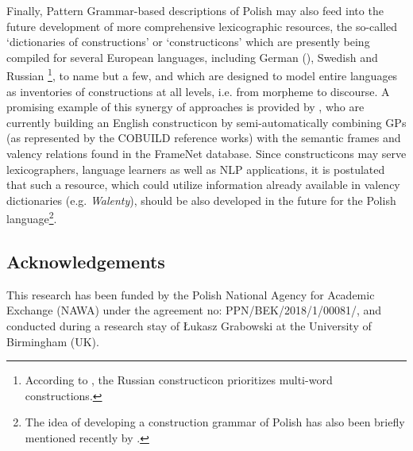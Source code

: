\documentclass[output=paper]{langscibook}
\begin{document}
Finally, Pattern Grammar-based descriptions of Polish may also feed into the future development of more comprehensive lexicographic resources, the so-called ‘dictionaries of constructions’ or ‘constructicons’ which are presently being compiled for several European languages, including German (\citealt{BoasZiem2018}), Swedish \citep{LyngfeltEtAl2018AtWork} and Russian \citep{JandaEtAl2018}\footnote{\textrm{According to \citet[165]{JandaEtAl2018}, the Russian constructicon prioritizes multi-word constructions.}}, to name but a few, and which are designed to model entire languages as inventories of constructions at all levels, i.e. from morpheme to discourse. A promising example of this synergy of approaches is provided by \citet{PerekPatten2019}, who are currently building an English constructicon by semi-automatically combining GPs (as represented by the COBUILD reference works) with the semantic frames and valency relations found in the FrameNet database. Since constructicons may serve lexicographers, language learners as well as NLP applications, it is postulated that such a resource, which could utilize information already available in valency dictionaries (e.g. \textit{Walenty}), should be also developed in the future for the Polish language\footnote{\textrm{The idea of developing a construction grammar of Polish has also been briefly mentioned recently by \citet{Wierzbicka-Piotrowska2019}.}}.


\subsection{Acknowledgements}


This research has been funded by the Polish National Agency for Academic Exchange (NAWA) under the agreement no: PPN/BEK/2018/1/00081/, and conducted during a research stay of Łukasz Grabowski at the University of Birmingham (UK).

{\sloppy\printbibliography[heading=subbibliography,notkeyword=this]}
\end{document}
